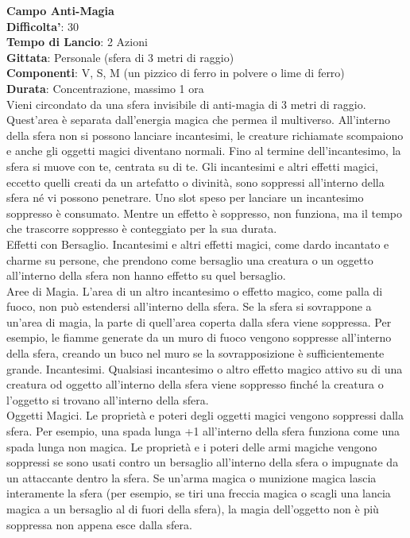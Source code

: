 \begin{multicols}{2}
\medskip\textbf{Campo Anti-Magia}\\
\textbf{Difficolta'}: 30\\
\textbf{Tempo di Lancio}: 2 Azioni\\
\textbf{Gittata}: Personale (sfera di 3 metri di raggio)\\
\textbf{Componenti}: V, S, M (un pizzico di ferro in polvere o lime di ferro)\\
\textbf{Durata}: Concentrazione, massimo 1 ora\\
Vieni circondato da una sfera invisibile di anti-magia di 3 metri di raggio. Quest’area è separata dall’energia magica che permea il multiverso. All’interno della sfera non si possono lanciare incantesimi, le creature richiamate scompaiono e anche gli oggetti magici diventano normali. Fino al termine dell’incantesimo, la sfera si muove con te, centrata su di te. Gli incantesimi e altri effetti magici, eccetto quelli creati da un artefatto o divinità, sono soppressi all’interno della sfera né vi possono penetrare. Uno slot speso per lanciare un incantesimo soppresso è consumato. Mentre un effetto è soppresso, non funziona, ma il tempo che trascorre soppresso è conteggiato per la sua durata. 
\\Effetti con Bersaglio. Incantesimi e altri effetti magici, come dardo incantato e charme su persone, che prendono come bersaglio una creatura o un oggetto all’interno della sfera non hanno effetto su quel bersaglio.
\\Aree di Magia. L’area di un altro incantesimo o effetto magico, come palla di fuoco, non può estendersi all’interno della sfera. Se la sfera si sovrappone a un’area di magia, la parte di quell’area coperta dalla sfera viene soppressa. Per esempio, le fiamme generate da un muro di fuoco vengono soppresse all’interno della sfera, creando un buco nel muro se la sovrapposizione è sufficientemente grande. Incantesimi. Qualsiasi incantesimo o altro effetto magico attivo su di una creatura od oggetto all’interno della sfera viene soppresso finché la creatura o l’oggetto si trovano all’interno della sfera.\\
Oggetti Magici. Le proprietà e poteri degli oggetti magici vengono soppressi dalla sfera. Per esempio, una spada lunga +1 all’interno della sfera funziona come una spada lunga non magica. Le proprietà e i poteri delle armi magiche vengono soppressi se sono usati contro un bersaglio all’interno  della sfera o impugnate da un attaccante dentro la sfera. Se un’arma magica o munizione magica lascia interamente la sfera (per esempio, se tiri una freccia magica o scagli una lancia magica a un bersaglio al di fuori della sfera), la magia dell’oggetto non è più soppressa non appena esce dalla sfera.

\end{multicols}

